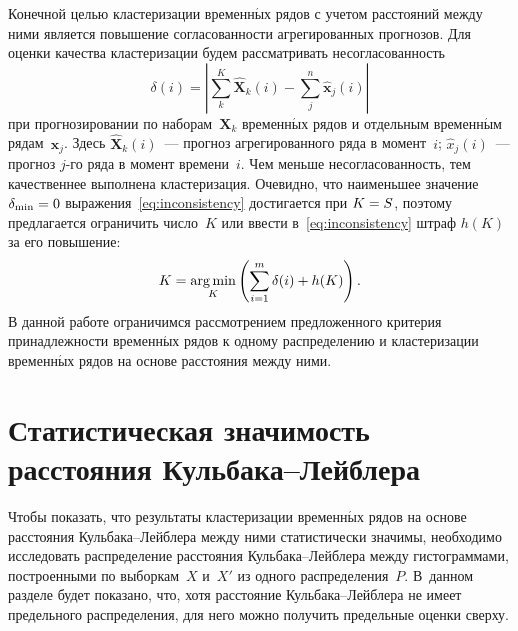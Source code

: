 \begin{multicols}{2}
Конечной целью кластеризации временн$\acute{\mbox{ы}}$х рядов с учетом расстояний между
ними является повыше\-ние согласованности агрегированных прогнозов.
Для оценки качества кластеризации будем рассматривать несогласованность
\begin{equation}
\label{eq:inconsistency}
\delta(i) = \left|\sum\limits_k^{K} \mathbf{\hat{X}}_k(i) -
\sum\limits_j^{n} \mathbf{\hat{x}}_j(i) \right|
\end{equation}
 при прогнозировании  по наборам~$\mathbf{X}_k$ временн$\acute{\mbox{ы}}$х
 рядов и отдельным временн$\acute{\mbox{ы}}$м рядам~$\mathbf{x}_j$. Здесь
 $\hat{\mathbf{X}}_k(i)$~--- прогноз агрегированного ряда в момент~$i$;
 $\hat{x}_j(i)$~--- прогноз $j$-го ряда в момент времени~$i$.
 Чем меньше несогласованность, тем качественнее выполнена кластеризация.
 Очевидно, что наименьшее значение $\delta_{\min} \hm= 0$
 выражения~\eqref{eq:inconsistency} достигается при $K\hm = S$, поэтому
 предлагается ограничить чис\-ло~$K$ или ввести в~\eqref{eq:inconsistency}
 штраф $h(K)$ за его повышение:
  $$
  K = \mathop{\mathrm{arg}\,\mathrm{min}}\limits_{K} \left(\sum\limits_{i = 1}^{m} \delta(i) + h(K)\right).
  $$
  В данной работе ограничимся рассмотрением предложенного критерия принадлежности
  временн$\acute{\mbox{ы}}$х рядов к одному распределению и кластеризации
  временн$\acute{\mbox{ы}}$х рядов на основе расстояния между \mbox{ними}.

\section{Статистическая значимость расстояния Кульбака--Лейблера}
\label{Sec:KLsignificance}

Чтобы показать, что результаты кластеризации временн$\acute{\mbox{ы}}$х
рядов на основе расстояния Кульбака--Лейб\-ле\-ра между ними статистически значимы,
необходимо исследовать распределение рас\-сто\-яния Куль\-ба\-ка--Лейб\-ле\-ра между
гистограммами, построенными по выборкам~$X$ и~$X'$ из одного распределения~$P$.
В~данном разделе будет показано, что, хотя расстояние Кульбака--Лейблера не имеет
предельного распределения, для него можно получить предельные оценки сверху.


\end{multicols}
